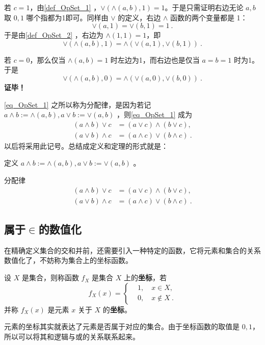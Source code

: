 若 $c=1$，由\autoref{def_OpSet_1} ，$\lor(\land(a,b),1)=1$。于是只需证明右边无论 $a,b$ 取 $0,1$ 哪个指都为1即可。同样由 $\lor$ 的定义，右边 $\land$ 函数的两个变量都是 1：
\begin{equation}
\lor(a,1)=\lor(b,1)=1~.
\end{equation}
于是由\autoref{def_OpSet_2} ，右边为 $\land(1,1)=1$，即
\begin{equation}
\lor(\land(a,b),1)=\land(\lor(a,1),\lor(b,1))~.
\end{equation}

若 $c=0$，那么仅当 $\land(a,b)=1$ 时左边为1，而右边也是仅当 $a=b=1$ 时为1。于是
\begin{equation}
\lor(\land(a,b),0)=\land(\lor(a,0),\lor(b,0))~.
\end{equation}
\textbf{证毕！}

\autoref{eq_OpSet_1} 之所以称为分配律，是因为若记 $a\land b:=\land(a,b),a\lor b:=\lor(a,b)$ ，则\autoref{eq_OpSet_1} 成为
\begin{equation}
\begin{aligned}
(a\land b)\lor c&=(a\lor c)\land(b\lor c),\\
(a\lor b)\land c&=(a\land c)\lor(b\land c)~.
\end{aligned}
\end{equation}
以后将采用此记号。总结成定义和定理的形式就是：
\begin{definition}{}
定义 $a\land b:=\land(a,b),a\lor b:=\lor(a,b)$ 。
\end{definition}
\begin{theorem}{分配律}\label{the_OpSet_2}
\begin{equation}
\begin{aligned}
(a\land b)\lor c&=(a\lor c)\land(b\lor c),\\
(a\lor b)\land c&=(a\land c)\lor(b\land c)~.
\end{aligned}
\end{equation}
\end{theorem}
\subsection{属于$\in$的数值化}
在精确定义集合的交和并前，还需要引入一种特定的函数，它将元素和集合的关系数值化了，不妨称为集合上的坐标函数。
\begin{definition}{}\label{def_OpSet_6}
设 $X$ 是集合，则称函数 $f_X$ 是集合 $X$ 上的\textbf{坐标}，若
\begin{equation}\label{eq_OpSet_3}
f_X(x)=\left\{\begin{aligned}
&1,\quad x\in X,\\
&0,\quad x\notin X~.
\end{aligned}\right.
\end{equation}
并称 $f_X(x)$ 是元素 $x$ 关于 $X$ 的\textbf{坐标}。
\end{definition}
元素的坐标其实就表达了元素是否属于对应的集合。由于坐标函数的取值是 $0,1$，所以可以将其和逻辑与或的关系联系起来。


